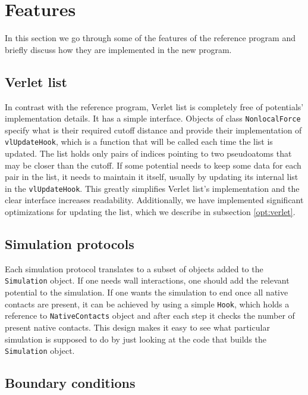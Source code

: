 \section{Features}\label{new:features}

In this section we go through some of the features of the reference program and briefly discuss how they are implemented in the new program.

\subsection{Verlet list}

In contrast with the reference program, Verlet list is completely free of potentials' implementation details. It has a simple interface. Objects of class \texttt{NonlocalForce} specify what is their required cutoff distance and provide their implementation of \texttt{vlUpdateHook}, which is a function that will be called each time the list is updated. The list holds only pairs of indices pointing to two pseudoatoms that may be closer than the cutoff. If some potential needs to keep some data for each pair in the list, it needs to maintain it itself, usually by updating its internal list in the \texttt{vlUpdateHook}. This greatly simplifies Verlet list's implementation and the clear interface increases readability. Additionally, we have implemented significant optimizations for updating the list, which we describe in subsection \ref{opt:verlet}.

\subsection{Simulation protocols}

Each simulation protocol translates to a subset of objects added to the \texttt{Simulation} object. If one needs wall interactions, one should add the relevant potential to the simulation. If one wants the simulation to end once all native contacts are present, it can be achieved by using a simple \texttt{Hook}, which holds a reference to \texttt{NativeContacts} object and after each step it checks the number of present native contacts. This design makes it easy to see what particular simulation is supposed to do by just looking at the code that builds the \texttt{Simulation} object.

\subsection{Boundary conditions}

